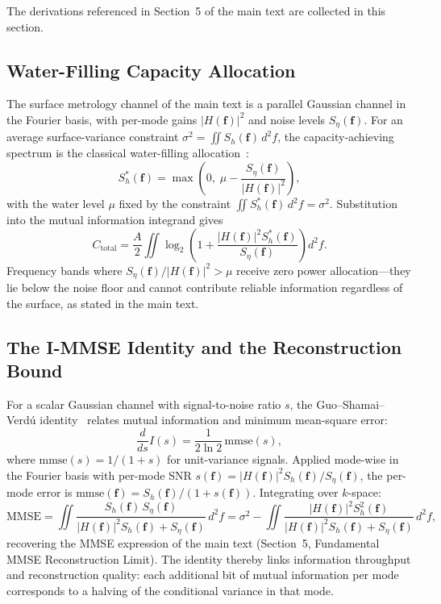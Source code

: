 \documentclass[review,12pt]{elsarticle}
\begin{document}
The derivations referenced in Section~5 of the main text are collected in this section.

\subsection{Water-Filling Capacity Allocation}
\label{S4.1}

The surface metrology channel of the main text is a parallel Gaussian channel in the Fourier basis, with per-mode gains $|H(\mathbf{f})|^2$ and noise levels $S_\eta(\mathbf{f})$. For an average surface-variance constraint $\sigma^2 = \iint S_h(\mathbf{f})\,d^2\!f$, the capacity-achieving spectrum is the classical water-filling allocation~\cite{cover2006elements}:
\begin{equation}
    S_h^*(\mathbf{f}) = \max\!\left(0,\; \mu - \frac{S_\eta(\mathbf{f})}{|H(\mathbf{f})|^2}\right),
    \label{eq:waterfilling}
\end{equation}
with the water level $\mu$ fixed by the constraint $\iint S_h^*(\mathbf{f})\,d^2\!f = \sigma^2$. Substitution into the mutual information integrand gives
\begin{equation}
    C_\mathrm{total} = \frac{A}{2}\iint \log_2\!\left(1 + \frac{|H(\mathbf{f})|^2 S_h^*(\mathbf{f})}{S_\eta(\mathbf{f})}\right) d^2\!f .
    \label{eq:capacity_waterfilling}
\end{equation}
Frequency bands where $S_\eta(\mathbf{f})/|H(\mathbf{f})|^2 > \mu$ receive zero power allocation---they lie below the noise floor and cannot contribute reliable information regardless of the surface, as stated in the main text.

\subsection{The I-MMSE Identity and the Reconstruction Bound}
\label{S4.2}

For a scalar Gaussian channel with signal-to-noise ratio $s$, the Guo--Shamai--Verd\'{u} identity~\cite{guo2005mutual} relates mutual information and minimum mean-square error:
\begin{equation}
    \frac{d}{ds} I(s) = \frac{1}{2\ln 2}\,\mathrm{mmse}(s),
    \label{eq:immse}
\end{equation}
where $\mathrm{mmse}(s) = 1/(1+s)$ for unit-variance signals. Applied mode-wise in the Fourier basis with per-mode SNR $s(\mathbf{f}) = |H(\mathbf{f})|^2 S_h(\mathbf{f})/S_\eta(\mathbf{f})$, the per-mode error is $\mathrm{mmse}(\mathbf{f}) = S_h(\mathbf{f})/(1+s(\mathbf{f}))$. Integrating over $k$-space:
\begin{equation}
    \mathrm{MMSE} = \iint \frac{S_h(\mathbf{f})\,S_\eta(\mathbf{f})}{|H(\mathbf{f})|^2 S_h(\mathbf{f}) + S_\eta(\mathbf{f})}\,d^2\!f
    = \sigma^2 - \iint \frac{|H(\mathbf{f})|^2 S_h^2(\mathbf{f})}{|H(\mathbf{f})|^2 S_h(\mathbf{f}) + S_\eta(\mathbf{f})}\,d^2\!f,
    \label{eq:immse_mmse}
\end{equation}
recovering the MMSE expression of the main text (Section~5, Fundamental MMSE Reconstruction Limit). The identity thereby links information throughput and reconstruction quality: each additional bit of mutual information per mode corresponds to a halving of the conditional variance in that mode.
\end{document}
